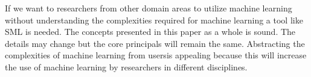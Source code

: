\documentclass[jair,twoside,11pt,theapa]{article}
\begin{document}
If we want to researchers from other domain areas to utilize machine learning without understanding the complexities required for machine learning a tool like SML is needed. The concepts presented in this paper as a whole is sound. The details may change but the core principals will remain the same. Abstracting the complexities of machine learning from usersis appealing because this will increase the use of machine learning by researchers in different disciplines.



\vskip 0.2in


\end{document}
